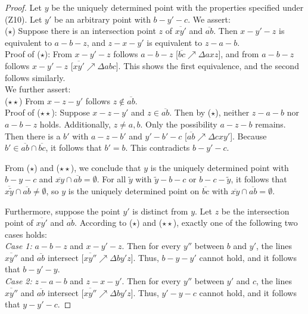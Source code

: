 \documentclass[11pt,a4paper]{article}
\newcommand{\betw}[3]{#1 - #2 - #3}
\newcommand{\lineab}[1]{\overline{#1}}
\begin{document}
\begin{proof}
Let $y$ be the uniquely determined point with the properties specified under (Z10). Let $y'$ be an arbitrary point with $\betw{b}{y'}{c}$. We assert: \\
($\star$) Suppose there is an intersection point $z$ of $\lineab{xy'}$ and $\lineab{ab}$. Then $\betw{x}{y'}{z}$ is equivalent to $\betw{a}{b}{z}$, and $\betw{z}{x}{y'}$ is equivalent to $\betw{z}{a}{b}$. \\
Proof of ($\star$): From $\betw{x}{y'}{z}$ follows $\betw{a}{b}{z}$ [$\lineab{bc} \nearrow \Delta a x z$], and from $\betw{a}{b}{z}$ follows $\betw{x}{y'}{z}$ [$\lineab{xy'} \nearrow \Delta a b c$]. This shows the first equivalence, and the second follows similarly. \\
We further assert: \\
($\star\star$) From $\betw{x}{z}{y'}$ follows $z \notin \lineab{ab}$. \\
Proof of ($\star\star$): Suppose $\betw{x}{z}{y'}$ and $z \in \lineab{ab}$. Then by ($\star$), neither $\betw{z}{a}{b}$ nor $\betw{a}{b}{z}$ holds. Additionally, $z \neq a, b$. Only the possibility $\betw{a}{z}{b}$ remains. Then there is a $b'$ with $\betw{a}{z}{b'}$ and $\betw{y'}{b'}{c}$ [$\lineab{ab} \nearrow \Delta c x y'$]. Because $b' \in \lineab{ab} \cap \lineab{bc}$, it follows that $b' = b$. This contradicts $\betw{b}{y'}{c}$.

From ($\star$) and ($\star\star$), we conclude that $y$ is the uniquely determined point with $\betw{b}{y}{c}$ and $\lineab{xy} \cap \lineab{ab} = \emptyset$. For all $\tilde{y}$ with $\betw{\tilde{y}}{b}{c}$ or $\betw{b}{c}{\tilde{y}}$, it follows that $\lineab{x\tilde{y}} \cap \lineab{ab} \neq \emptyset$, so $y$ is the uniquely determined point on $\lineab{bc}$ with $\lineab{xy} \cap \lineab{ab} = \emptyset$.

Furthermore, suppose the point $y'$ is distinct from $y$. Let $z$ be the intersection point of $\lineab{xy'}$ and $\lineab{ab}$. According to ($\star$) and ($\star\star$), exactly one of the following two cases holds: \\
\textit{Case 1:} $\betw{a}{b}{z}$ and $\betw{x}{y'}{z}$. Then for every $y''$ between $b$ and $y'$, the lines $\lineab{xy''}$ and $\lineab{ab}$ intersect [$\lineab{xy''} \nearrow \Delta b y' z$]. Thus, $\betw{b}{y}{y'}$ cannot hold, and it follows that $\betw{b}{y'}{y}$. \\
\textit{Case 2:} $\betw{z}{a}{b}$ and $\betw{z}{x}{y'}$. Then for every $y''$ between $y'$ and $c$, the lines $\lineab{xy''}$ and $\lineab{ab}$ intersect [$\lineab{xy''} \nearrow \Delta b y' z$]. Thus, $\betw{y'}{y}{c}$ cannot hold, and it follows that $\betw{y}{y'}{c}$.
\end{proof}
\end{document}

